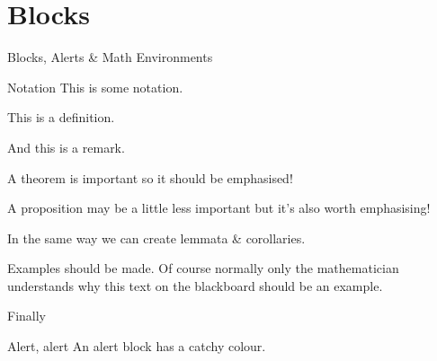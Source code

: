 
\section{Blocks}
\begin{frame}{Blocks, Alerts \& Math Environments}
	\begin{block}{Notation}
		This is some notation.
	\end{block}

	\begin{definition}
		This is a definition.
	\end{definition}
	
	\begin{remark}
		And this is a remark.
	\end{remark}
\end{frame}

\begin{frame}
	\begin{theorem}
		A theorem is important so it should be emphasised!
	\end{theorem}

	\begin{proposition}
		A proposition may be a little less important but it's also worth emphasising!
	\end{proposition}
	
	In the same way we can create lemmata \& corollaries.
\end{frame}

\begin{frame}\label{slide::ex-alert-el}
	\begin{example}
		Examples should be made. Of course normally only the mathematician understands why this text on the blackboard should be an example.
	\end{example}

	Finally
		
	\begin{alertblock}{Alert, alert}
		An alert block has a catchy colour.
	\end{alertblock}
\end{frame}


